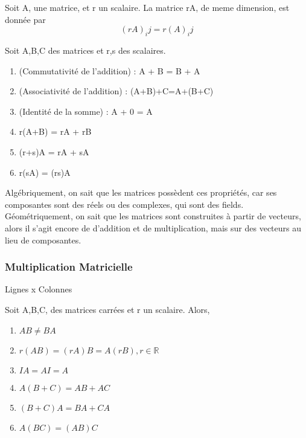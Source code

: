 \documentclass{article}
\begin{document}
\begin{definition}
    Soit A, une matrice, et r un scalaire. La matrice rA, de meme dimension,
    est donnée par $$ (rA)_ij = r(A)_ij$$
\end{definition}

\begin{remark}

\end{remark}

\begin{theorem}
    Soit A,B,C des matrices et r,s des scalaires.
    \begin{enumerate}
	\item (Commutativité de l'addition) : A + B = B + A
	\item (Associativité de l'addition) : (A+B)+C=A+(B+C)
	\item (Identité de la somme) : A + 0 = A
	\item r(A+B) = rA + rB
	\item (r+s)A = rA + sA
	\item r(sA) = (rs)A
    \end{enumerate}
\end{theorem}

\begin{remark}
    Algébriquement, on sait que les matrices possèdent ces propriétés,
    car ses composantes sont des réels ou des complexes, qui sont
    des fields. Géométriquement, on sait que les matrices sont construites
    à partir de vecteurs, alors il s'agit encore de d'addition et de
    multiplication, mais sur des vecteurs au lieu de composantes.
\end{remark}

\subsubsection{Multiplication Matricielle}

\begin{definition}
    Lignes x Colonnes
\end{definition}

\begin{theorem}
    Soit A,B,C, des matrices carrées et r un scalaire. Alors,
    \begin{enumerate}
	\item $ AB \neq BA$
	\item $ r(AB) = (rA)B = A(rB), r \in \mathbb{R}$
	\item $ IA = AI = A$
	\item $A(B+C) = AB + AC$
	\item $(B+C)A=BA + CA$
	\item $A(BC) = (AB)C$
    \end{enumerate}
\end{theorem}
\end{document}
